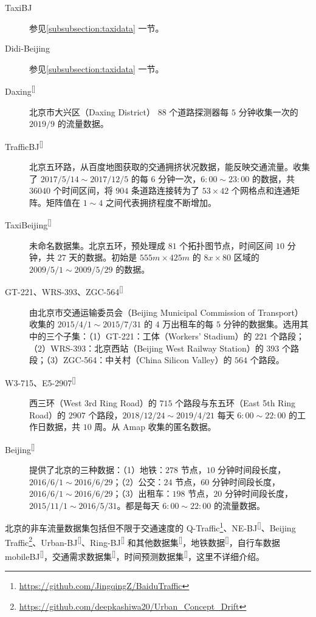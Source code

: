 \documentclass{ctexart}
\renewcommand{\cite}[1]{\textsuperscript{[\citenum{#1}]}}
\begin{document}
\begin{description}
    \item[TaxiBJ] 参见\ref{subsubsection:taxidata} 一节。
    \item[Didi-Beijing] 参见\ref{subsubsection:taxidata} 一节。
    \item[Daxing\cite{T-183}] 北京市大兴区（Daxing District） $88$ 个道路探测器每 $5$ 分钟收集一次的 $2019/9$ 的流量数据。
    \item[TrafficBJ\cite{T-123}] 北京五环路，从百度地图获取的交通拥挤状况数据，能反映交通流量。收集了 $2017/5/14\sim2017/12/5$ 的每 $6$ 分钟一次，$6:00\sim23:00$ 的数据，共 $36040$ 个时间区间，将 $904$ 条道路连接转为了 $53\times42$ 个网格点和连通矩阵。矩阵值在 $1\sim 4$ 之间代表拥挤程度不断增加。
    \item[TaxiBeijing\cite{T-188}] 未命名数据集。北京五环，预处理成 $81$ 个拓扑图节点，时间区间 $10$ 分钟，共 $27$ 天的数据。初始是 $555m\times425m$ 的 $8x\times80$ 区域的 $2009/5/1\sim2009/5/29$ 的数据。
    \item[GT-221、WRS-393、ZGC-564\cite{T-256}] 由北京市交通运输委员会（Beijing Municipal Commission of Transport）收集的 $2015/4/1\sim2015/7/31$ 的 $4$ 万出租车的每 $5$ 分钟的数据集。选用其中的三个子集：（1）GT-221：工体（Workers’ Stadium）的 $221$ 个路段；（2）WRS-393：北京西站（Beijing West Railway Station）的 $393$ 个路段；（3）ZGC-564：中关村（China Silicon Valley）的 $564$ 个路段。
    \item[W3-715、E5-2907\cite{T-319}] 西三环（West 3rd Ring Road）的 $715$ 个路段与东五环（East 5th Ring Road）的 $2907$ 个路段，$2018/12/24\sim2019/4/21$ 每天 $6:00\sim22:00$ 的工作日数据，共 $10$ 周。从 Amap 收集的匿名数据。
    \item[Beijing\cite{T-325}] 提供了北京的三种数据：（1）地铁：$278$ 节点，$10$ 分钟时间段长度，$2016/6/1\sim2016/6/29$；（2）公交：$24$ 节点，$60$ 分钟时间段长度，$2016/6/1\sim2016/6/29$；（3）出租车：$198$ 节点，$20$ 分钟时间段长度，$2015/11/1\sim2016/5/31$。都是每天 $6:00\sim22:00$ 的流量数据。
\end{description}

北京的非车流量数据集包括但不限于交通速度的 Q-Traffic\footnote{\url{https://github.com/JingqingZ/BaiduTraffic}}、NE-BJ\cite{T-134}、Beijing Traffic\footnote{\url{https://github.com/deepkashiwa20/Urban_Concept_Drift}}、Urban-BJ\cite{T-202}、Ring-BJ\cite{T-202} 和其他数据集\cite{T-190,T-214,T-247, T-140}，地铁数据\cite{T-209}，自行车数据 mobileBJ\cite{T-311}，交通需求数据集\cite{T-234, T-327, T-359}，时间预测数据集\cite{T-235, T-362}，这里不详细介绍。
\end{document}
